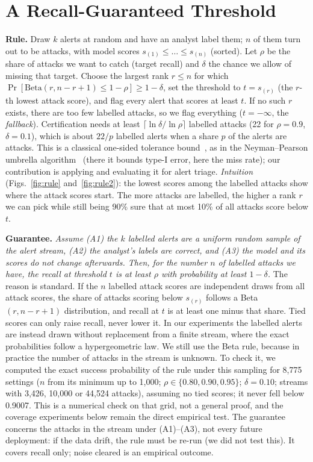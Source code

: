 \documentclass[conference]{IEEEtran}
\begin{document}
\section{A Recall-Guaranteed Threshold}
\label{sec:guarantee}

\textbf{Rule.} Draw $k$ alerts at random and have an analyst label them; $n$ of them turn out
to be attacks, with model scores $s_{(1)}\le\dots\le s_{(n)}$ (sorted). Let
$\rho$ be the share of attacks we want to catch (target recall) and $\delta$ the chance we allow
of missing that target. Choose the largest rank $r\le n$ for which
$\Pr[\mathrm{Beta}(r,n-r+1)\le 1-\rho]\ge 1-\delta$, set the threshold to $t=s_{(r)}$ (the
$r$-th lowest attack score), and flag every alert that scores at least $t$. If no such $r$ exists,
there are too few labelled attacks, so we flag everything ($t=-\infty$, the \emph{fallback}).
Certification needs at least $\lceil\ln\delta/\ln\rho\rceil$ labelled attacks (22 for
$\rho=0.9$, $\delta=0.1$), which is about $22/p$ labelled alerts when a share $p$ of the alerts
are attacks. This is a classical one-sided tolerance bound~\cite{wilks1941}, as in the Neyman--Pearson umbrella
algorithm~\cite{tong2018} (there it bounds type-I error, here the miss rate); our contribution is applying and
evaluating it for alert triage. \emph{Intuition} (Figs.~\ref{fig:rule} and~\ref{fig:rule2}): the
lowest scores among the labelled attacks show where the attack scores start. The more attacks are
labelled, the higher a rank $r$ we can pick while still being 90\% sure that at most 10\% of all
attacks score below $t$.


\textbf{Guarantee.} \emph{Assume (A1) the $k$ labelled alerts are a uniform random sample of the
alert stream, (A2) the analyst's labels are correct, and (A3) the model and its scores do not
change afterwards. Then, for the number $n$ of labelled attacks we have, the recall at threshold
$t$ is at least $\rho$ with probability at least $1-\delta$.} The reason is standard. If the $n$
labelled attack scores are independent draws from all attack scores, the share of attacks scoring
below $s_{(r)}$ follows a Beta$(r,n-r+1)$ distribution, and recall at $t$ is at least one minus
that share. Tied scores can only raise recall, never lower it. In our experiments the labelled alerts are instead drawn without
replacement from a finite stream, where the exact probabilities follow a hypergeometric law. We
still use the Beta rule, because in practice the number of attacks in the stream is unknown. To
check it, we computed the exact success probability of the rule under this sampling for 8,775
settings ($n$ from its minimum up to 1,000; $\rho\in\{0.80,0.90,0.95\}$; $\delta=0.10$; streams
with 3,426, 10,000 or 44,524 attacks), assuming no tied scores; it never fell below 0.9007. This
is a numerical check on that grid, not a general proof, and the coverage experiments below remain
the direct empirical test. The guarantee concerns the attacks in the stream under (A1)--(A3), not
every future deployment: if the data drift, the rule must be re-run (we did not test this). It
covers recall only; noise cleared is an empirical outcome.
\end{document}
